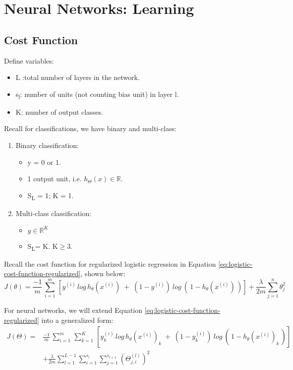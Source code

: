 \section{Neural Networks: Learning}
\subsection{Cost Function}
    Define variables:
    \begin{itemize}
        \item L :total number of layers in the network.
        \item s\textsubscript{l}: number of units (not counting bias unit) in layer l.
        \item K: number of output classes.
    \end{itemize}

    Recall for classifications, we have binary and multi-class:
    \begin{enumerate}
        \item Binary classification:
            \begin{itemize}
                \item y = 0 or 1.
                \item 1 output unit, i.e. $h_\Theta (x) \in \mathbb{R}$.
                \item S\textsubscript{L} = 1; K = 1.
            \end{itemize}
        \item Multi-class classification: 
            \begin{itemize}
                \item $ y \in \mathbb{R}^K$
                \item S\textsubscript{L}= K. K$\geq$3.
            \end{itemize}
    \end{enumerate}

    Recall the cost function for regularized logistic regression in Equation \ref{eq:logistic-cost-function-regularized}, shown below:
    \[
    J(\theta) = \frac{-1}{m} \, \sum_{i=1}^{m}\, [ y^{(i)}\, log\, h_\theta (x^{(i)})\; +\; (1-y^{(i)})\: log\:(\,1-h_\theta(x^{(i)})\,) ] + \frac{\lambda}{2m} \sum_{j=1}^{n} \theta_j^2
    \]

    For neural networks, we will extend Equation \ref{eq:logistic-cost-function-regularized} into a generalized form:
    \begin{equation}
        \begin{aligned}
    J(\Theta) = & \frac{-1}{m} \, \sum\limits_{i=1}^{m}\, \sum\limits_{k=1}^{K}\,[ y_k^{(i)}\, log\, h_\theta (x^{(i)})_k\; +\; (1-y_k^{(i)})\: log\:(\,1-h_\theta(x^{(i)})_k\,) ] \\
    & + \frac{\lambda}{2m} \sum\limits_{l=1}^{L-1}\sum\limits_{i=1}^{s_l}\sum\limits_{j=1}^{s_{l+1}} (\Theta_{j, i}^{(l)})^2
    \end{aligned}
        \label{eq:neural-network-cost-function-regularized}
    \end{equation}

